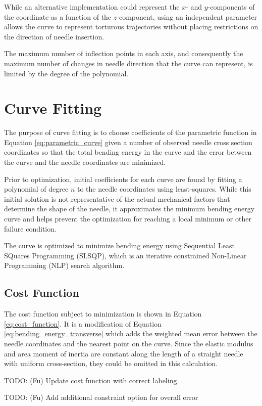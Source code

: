 While an alternative implementation could represent the $x$- and $y$-components of the coordinate as a function of the $z$-component, using an independent parameter allows the curve to represent torturous trajectories without placing restrictions on the direction of needle insertion.

The maximum number of inflection points in each axis, and consequently the maximum number of changes in needle direction that the curve can represent, is limited by the degree of the polynomial.

\section{Curve Fitting}
The purpose of curve fitting is to choose coefficients of the parametric function in Equation \ref{eq:parametric_curve} given a number of observed needle cross section coordinates so that the total bending energy in the curve and the error between the curve and the needle coordinates are minimized.

Prior to optimization, initial coefficients for each curve are found by fitting a polynomial of degree $n$ to the needle coordinates using least-squares. While this initial solution is not representative of the actual mechanical factors that determine the shape of the needle, it approximates the minimum bending energy curve and helps prevent the optimization for reaching a local minimum or other failure condition.

The curve is optimized to minimize bending energy using Sequential Least SQuares Programming (SLSQP), which is an iterative constrained Non-Linear Programming (NLP) search algorithm\cite{kraft_software_1988}.

\subsection{Cost Function}
The cost function subject to minimization is shown in Equation \ref{eq:cost_function}. It is a modification of Equation \ref{eq:bending_energy_transverse} which adds the weighted mean error between the needle coordinates and the nearest point on the curve. Since the elastic modulus and area moment of inertia are constant along the length of a straight needle with uniform cross-section, they could be omitted in this calculation. 

TODO: (Fu) Update cost function with correct labeling

TODO: (Fu) Add additional constraint option for overall error

